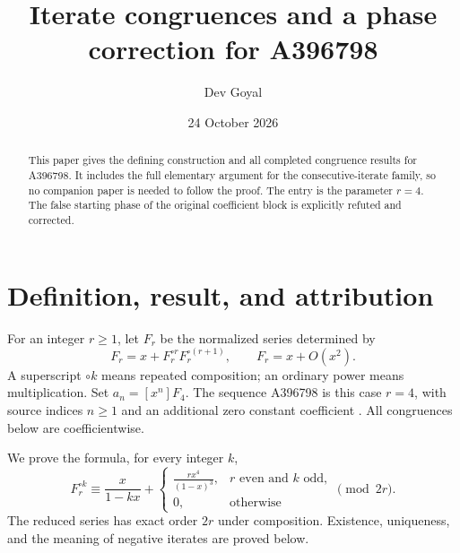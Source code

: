 \documentclass[11pt,a4paper]{article}
\title{Iterate congruences and a phase correction for A396798}
\author{Dev Goyal}
\date{24 October 2026}
\theoremstyle{remark}\newtheorem{remark}[theorem]{Remark}
\begin{document}
\maketitle
\begin{center}\end{center}

\begin{abstract}
This paper gives the defining construction and all completed congruence
results for A396798. It includes the full elementary argument for the
consecutive-iterate family, so no companion paper is needed to follow the
proof. The entry is the parameter $r=4$.
The false starting phase of the original coefficient block is explicitly refuted and corrected.
\end{abstract}
\section{Definition, result, and attribution}
For an integer $r\ge1$, let $F_r$ be the normalized series determined by
\begin{equation}\label{eq:family}
 F_r=x+F_r^{\circ r}F_r^{\circ(r+1)},\qquad F_r=x+O(x^2).
\end{equation}
A superscript $\circ k$ means repeated composition; an ordinary power
means multiplication. Set $a_n=[x^n]F_{4}$.
The sequence A396798 is this case $r=4$, with source
indices $n\ge1$ and an additional zero constant coefficient \cite{oeis}.
All congruences below are coefficientwise.

We prove the formula, for every integer $k$,
\[
F_r^{\circ k}\equiv
\frac{x}{1-kx}+
\begin{cases}
\displaystyle\frac{rx^4}{(1-x)^3},&r\text{ even and }k\text{ odd},\\[5pt]
0,&\text{otherwise}
\end{cases}
\pmod{2r}.
\]
The reduced series has exact order $2r$ under composition. Existence,
uniqueness, and the meaning of negative iterates are proved below.
\end{document}
